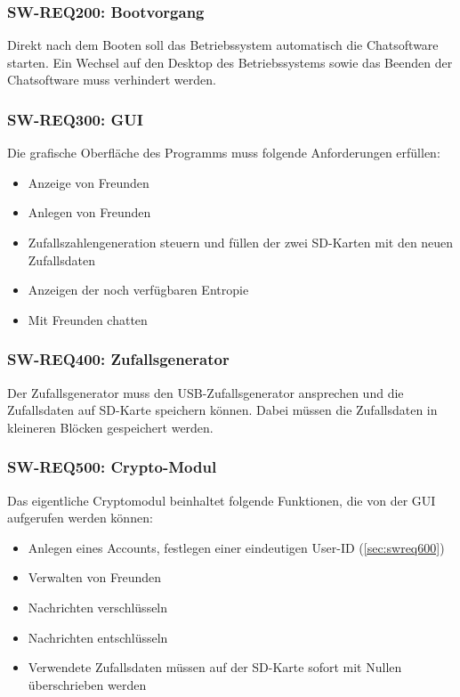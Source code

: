 \subsubsection{SW-REQ200: Bootvorgang}
\label{sec:swreq200}
Direkt nach dem Booten soll das Betriebssystem automatisch die Chatsoftware
starten. Ein Wechsel auf den Desktop des Betriebssystems sowie das Beenden der
Chatsoftware muss verhindert werden. 

\subsubsection{SW-REQ300: GUI}
\label{sec:swreq300}
Die grafische Oberfläche des Programms muss folgende Anforderungen erfüllen:
\begin{itemize}
\item Anzeige von Freunden
\item Anlegen von Freunden
\item Zufallszahlengeneration steuern und füllen der zwei SD-Karten mit den neuen
Zufallsdaten
\item Anzeigen der noch verfügbaren Entropie
\item Mit Freunden chatten 
\end{itemize}

\subsubsection{SW-REQ400: Zufallsgenerator}
\label{sec:swreq400}
Der Zufallsgenerator muss den USB-Zufallsgenerator ansprechen und die
Zufallsdaten auf SD-Karte speichern können. Dabei müssen die Zufallsdaten in
kleineren Blöcken gespeichert werden.

\subsubsection{SW-REQ500: Crypto-Modul}
\label{sec:swreq500}
Das eigentliche Cryptomodul beinhaltet folgende Funktionen, die von der GUI
aufgerufen werden können:
\begin{itemize}
\item Anlegen eines Accounts, festlegen einer eindeutigen User-ID
(\ref{sec:swreq600})
\item Verwalten von Freunden
\item Nachrichten verschlüsseln
\item Nachrichten entschlüsseln
\item Verwendete Zufallsdaten müssen auf der SD-Karte sofort mit Nullen
überschrieben werden 
\end{itemize}

